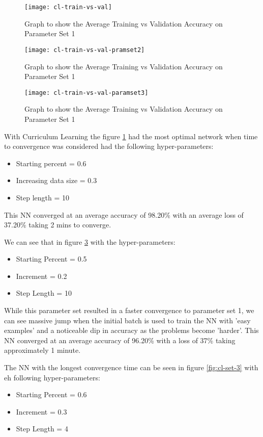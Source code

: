 \documentclass[conference]{IEEEtran}
\begin{document}
\begin{figure}
	\caption{Graph to show the Average Training vs Validation Accuracy on Parameter Set 1}
	\texttt{[image: cl-train-vs-val]}
	\centering
	\label{fig:cl-set-1}
\end{figure}

\begin{figure}
	\caption{Graph to show the Average Training vs Validation Accuracy on Parameter Set 1}
	\texttt{[image: cl-train-vs-val-pramset2]}
	\centering
	\label{fig:cl-set-2}
\end{figure}

\begin{figure}
	\caption{Graph to show the Average Training vs Validation Accuracy on Parameter Set 1}
	\texttt{[image: cl-train-vs-val-paramset3]}
	\centering
	\label{fig:cl-set-2}
\end{figure}

With Curriculum Learning the figure \ref{fig:cl-set-1} had the most optimal network when time to convergence was considered had the following hyper-parameters:
\begin{itemize}
	\item Starting percent = 0.6
	\item Increasing data size = 0.3
	\item Step length = 10
\end{itemize}

This NN converged at an average accuracy of 98.20\% with an average loss of 37.20\% taking 2 mins to converge.

We can see that in figure \ref{fig:cl-set-2} with the hyper-parameters:
\begin{itemize}
	\item Starting Percent = 0.5
	\item Increment = 0.2
	\item Step Length = 10
\end{itemize}

While this parameter set resulted in a faster convergence to parameter set 1, we can see massive jump when the initial batch is used to train the NN with 'easy examples' and a noticeable dip in accuracy as the problems become 'harder'. This NN converged at an average accuracy of 96.20\% with a loss of 37\% taking approximately 1 minute.

The NN with the longest convergence time can be seen in figure \ref{fig:cl-set-3} with eh following hyper-parameters:
\begin{itemize}
	\item Starting Percent = 0.6
	\item Increment = 0.3
	\item Step Length = 4
\end{itemize}
\end{document}
